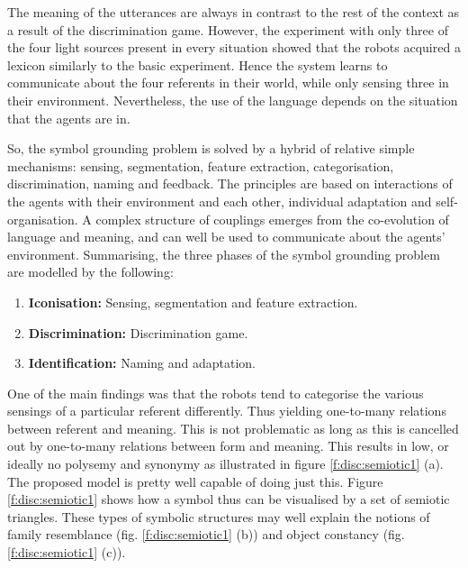The meaning of the utterances are always in contrast to the rest of the context as a result of the discrimination game. However, the experiment with only three of the four light sources present in every situation showed that the robots acquired a lexicon similarly to the basic experiment. Hence the system learns to communicate about the four referents in their world, while only sensing three in their environment. Nevertheless, the use of the language depends on the situation that the agents are in.

So, the symbol grounding problem is solved by a hybrid of relative simple mechanisms: sensing, segmentation, feature extraction, categorisation, discrimination, naming and feedback. The principles are based on interactions of the agents with their environment and each other, individual adaptation and self-organisation. A complex structure of couplings emerges from the co-evolution of language and meaning, and can well be used to communicate about the agents' environment. Summarising, the three phases of the symbol grounding problem are modelled by the following:

\begin{enumerate}
\item {\bf Iconisation:} Sensing, segmentation and feature extraction.
\item {\bf Discrimination:} Discrimination game.
\item {\bf Identification:} Naming and adaptation.
\end{enumerate}

One of the main findings was that the robots tend to categorise the various sensings of a particular referent differently. Thus yielding one-to-many relations between referent and meaning. This is not problematic as long as this is cancelled out by one-to-many relations between form and meaning. This results in low, or ideally no polysemy and synonymy as illustrated in figure \ref{f:disc:semiotic1} (a). The proposed model is pretty well capable of doing just this. Figure \ref{f:disc:semiotic1} shows how a symbol thus can be visualised by a set of semiotic triangles. These types of symbolic structures may well explain the notions of family resemblance (fig. \ref{f:disc:semiotic1} (b)) and object constancy (fig. \ref{f:disc:semiotic1} (c)).

